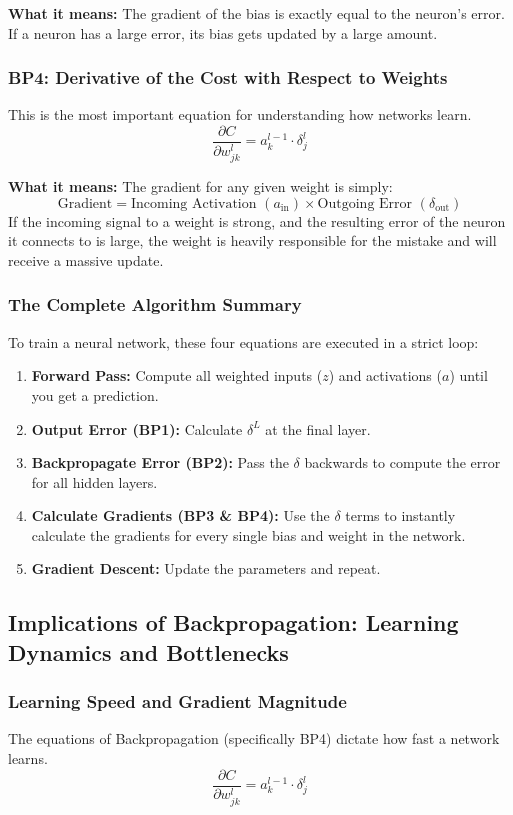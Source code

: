 \documentclass[11pt]{article}
\theoremstyle{smallexample}
\begin{document}
\textbf{What it means:} 
The gradient of the bias is exactly equal to the neuron's error. If a neuron has a large error, its bias gets updated by a large amount.

\subsubsection{BP4: Derivative of the Cost with Respect to Weights}
This is the most important equation for understanding how networks learn.
\[ \frac{\partial C}{\partial w_{jk}^l} = a_k^{l-1} \cdot \delta_j^l \]

\textbf{What it means:} 
The gradient for any given weight is simply:
\[ \text{Gradient} = \text{Incoming Activation } (a_{\text{in}}) \times \text{Outgoing Error } (\delta_{\text{out}}) \]
If the incoming signal to a weight is strong, and the resulting error of the neuron it connects to is large, the weight is heavily responsible for the mistake and will receive a massive update.

\subsubsection{The Complete Algorithm Summary}
To train a neural network, these four equations are executed in a strict loop:
\begin{enumerate}
    \item \textbf{Forward Pass:} Compute all weighted inputs ($z$) and activations ($a$) until you get a prediction.
    \item \textbf{Output Error (BP1):} Calculate $\delta^L$ at the final layer.
    \item \textbf{Backpropagate Error (BP2):} Pass the $\delta$ backwards to compute the error for all hidden layers.
    \item \textbf{Calculate Gradients (BP3 \& BP4):} Use the $\delta$ terms to instantly calculate the gradients for every single bias and weight in the network.
    \item \textbf{Gradient Descent:} Update the parameters and repeat.
\end{enumerate}

\subsection{Implications of Backpropagation: Learning Dynamics and Bottlenecks}

\subsubsection{Learning Speed and Gradient Magnitude}
The equations of Backpropagation (specifically BP4) dictate how fast a network learns.
\[ \frac{\partial C}{\partial w_{jk}^l} = a_k^{l-1} \cdot \delta_j^l \]
\end{document}
